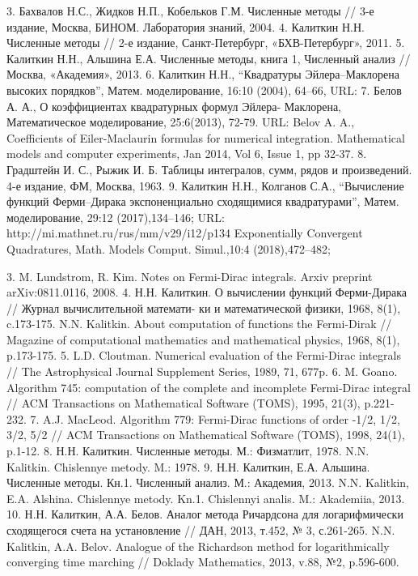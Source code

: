 3. Бахвалов Н.С., Жидков Н.П., Кобельков Г.М. Численные методы // 3-е
издание, Москва, БИНОМ. Лаборатория знаний, 2004.
4. Калиткин Н.Н. Численные методы // 2-е издание, Санкт-Петербург,
«БХВ-Петербург», 2011.
5. Калиткин Н.Н., Альшина Е.А. Численные методы, книга 1, Численный
анализ // Москва, «Академия», 2013.
6. Калиткин Н.Н., “Квадратуры Эйлера–Маклорена высоких порядков”,
Матем. моделирование, 16:10 (2004), 64–66, URL:
7. Белов А. А., О коэффициентах квадратурных формул Эйлера-
Маклорена, Математическое моделирование, 25:6(2013), 72-79. URL:
Belov A. A., Coefficients of Eiler-Maclaurin formulas for numerical
integration. Mathematical models and computer experiments, Jan 2014, Vol 6, Issue
1, pp 32-37.
8. Градштейн И. С., Рыжик И. Б. Таблицы интегралов, сумм, рядов и
произведений. 4-е издание, ФМ, Москва, 1963.
9. Калиткин Н.Н., Колганов С.А., “Вычисление функций Ферми–Дирака
экспоненциально сходящимися квадратурами”, Матем. моделирование, 29:12
(2017),134–146; URL: http://mi.mathnet.ru/rus/mm/v29/i12/p134
Exponentially Convergent Quadratures, Math. Models Comput. Simul.,10:4
(2018),472–482;

3. M. Lundstrom, R. Kim. Notes on Fermi-Dirac integrals. Arxiv preprint arXiv:0811.0116, 2008.
4. Н.Н. Калиткин. О вычислении функций Ферми-Дирака // Журнал вычислительной математи-
ки и математической физики, 1968, 8(1), c.173-175.
N.N. Kalitkin. About computation of functions the Fermi-Dirak // Magazine of computational mathematics
and mathematical physics, 1968, 8(1), p.173-175.
5. L.D. Cloutman. Numerical evaluation of the Fermi-Dirac integrals // The Astrophysical Journal
Supplement Series, 1989, 71, 677p.
6. M. Goano. Algorithm 745: computation of the complete and incomplete Fermi-Dirac integral //
ACM Transactions on Mathematical Software (TOMS), 1995, 21(3), p.221-232.
7. A.J. MacLeod. Algorithm 779: Fermi-Dirac functions of order -1/2, 1/2, 3/2, 5/2 // ACM Transactions
on Mathematical Software (TOMS), 1998, 24(1), p.1-12.
8. Н.Н. Калиткин. Численные методы. М.: Физматлит, 1978.
N.N. Kalitkin. Chislennye metody. M.: 1978.
9. Н.Н. Калиткин, Е.А. Альшина. Численные методы. Кн.1. Численный анализ. М.: Академия, 2013.
N.N. Kalitkin, E.A. Alshina. Chislennye metody. Kn.1. Chislennyi analis. M.: Akademiia, 2013.
10. Н.Н. Калиткин, А.А. Белов. Аналог метода Ричардсона для логарифмически сходящегося
счета на установление // ДАН, 2013, т.452, № 3, с.261-265.
N.N. Kalitkin, A.A. Belov. Analogue of the Richardson method for logarithmically converging time
marching // Doklady Mathematics, 2013, v.88, №2, p.596-600.


